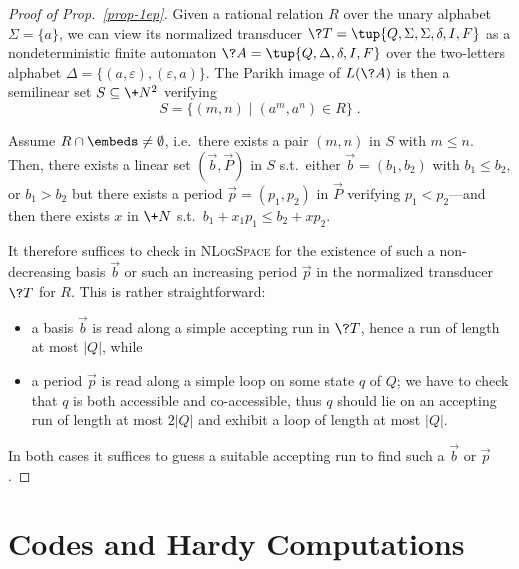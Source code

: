 \begin{proof}[Proof of Prop.~\ref{prop-1ep}]
Given a rational relation $R$ over the unary alphabet $\Sigma=\{a\}$,
we can view its normalized transducer
$\?T=\tup{Q,\Sigma,\Sigma,\delta,I,F}$ as a nondeterministic finite
automaton $\?A=\tup{Q,\Delta,\delta,I,F}$ over the two-letters
alphabet $\Delta=\{(a,\varepsilon),(\varepsilon,a)\}$.  The Parikh
image of $L(\?A)$ is then a semilinear set
$S\subseteq\+N^2$ verifying
\begin{equation}
 S=\{(m,n)\mid (a^m,a^n)\in R\}\;.
\end{equation}


Assume $R\cap{\embeds}\neq\emptyset$, i.e.\
there exists a pair $(m,n)$ in $S$ with $m\leq n$.  Then, there exists
a linear set $(\vec{b},\vec{P})$ in $S$ s.t.\ either
$\vec{b}=(b_1,b_2)$ with $b_1\leq b_2$, or $b_1>b_2$ but there exists
a period $\vec{p}=(p_1,p_2)$ in $\vec{P}$ verifying $p_1<p_2$---and
then there exists $x$ in $\+N$ s.t.\ $b_1+x_1p_1\leq b_2+xp_2$.

It therefore suffices to check in \textsc{NLogSpace} for the existence
of such a non-decreasing basis $\vec{b}$ or such an increasing period
$\vec{p}$ in the normalized transducer $\?T$ for $R$.  This is rather
straightforward:
\begin{itemize}
\item a basis $\vec{b}$ is read along a simple accepting
  run in $\?T$, hence a run of length at most $|Q|$, while
\item a period $\vec{p}$ is read along a simple loop on some state $q$
  of $Q$; we have to check that $q$ is both accessible and
  co-accessible, thus $q$ should lie on an accepting run of length at
  most $2|Q|$ and exhibit a loop of length at most $|Q|$.
\end{itemize}
In both cases it suffices to guess a suitable accepting run to find
such a $\vec{b}$ or $\vec{p}$.
\end{proof}

\section{Codes and Hardy Computations}

